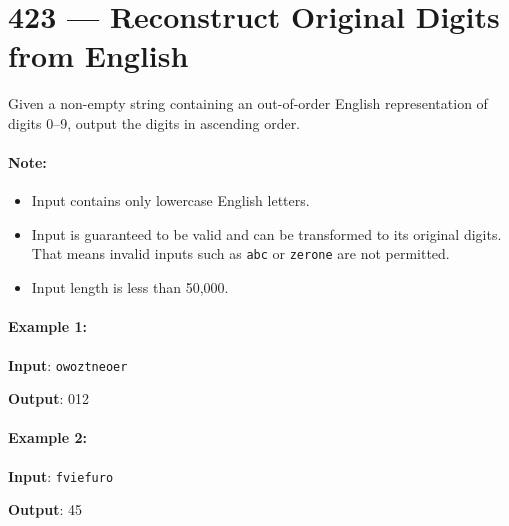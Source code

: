 \section{423 --- Reconstruct Original Digits from English}
Given a non-empty string containing an out-of-order English representation of digits 0--9, output the digits in ascending order.

\paragraph{Note:}
\begin{itemize}
\item Input contains only lowercase English letters.
\item Input is guaranteed to be valid and can be transformed to its original digits. That means invalid inputs such as \texttt{abc} or \texttt{zerone} are not permitted.
\item Input length is less than 50,000.
\end{itemize}

\paragraph{Example 1:}

\begin{flushleft}
\textbf{Input}: \texttt{owoztneoer}

\textbf{Output}: 012
\end{flushleft}

\paragraph{Example 2:}
\begin{flushleft}
\textbf{Input}: \texttt{fviefuro}

\textbf{Output}: 45
\end{flushleft}

